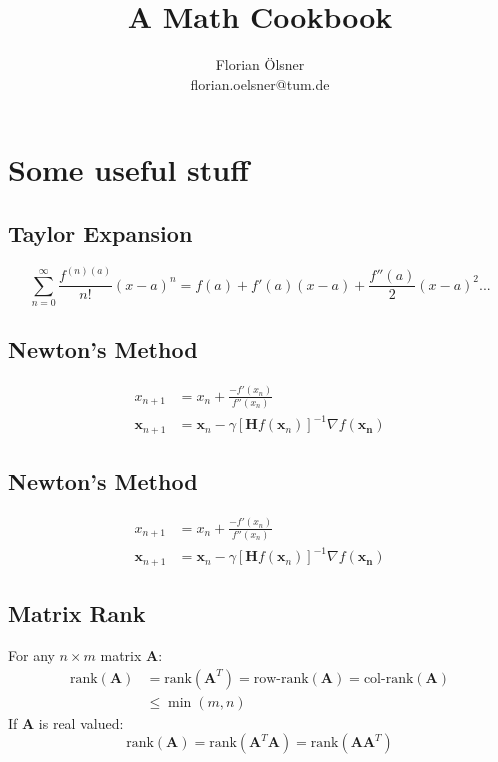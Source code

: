 \documentclass[%
	pdftex,
	12pt,								%
	parskip=half,				%
	headheight = 12pt,	%
	headsepline,				%
	footsepline,				%
	footheight = 16pt,	%
	DIV=calc,						%
	BCOR=8mm,						%
	headinclude=false,	%
	footinclude=false,	%
]{scrreprt}						%
\title{A Math Cookbook}
\author{Florian \"Olsner\\florian.oelsner@tum.de}
\begin{document}
\maketitle
\newpage

 \chapter{Some useful stuff}
 \section{Taylor Expansion}
 \begin{equation}
 	\sum_{n=0}^{\infty} \frac{f^{(n)(a)}}{n!}(x - a)^n = f(a) + f'(a) (x-a) + \frac{f''(a)}{2}(x-a)^2 ...
 \end{equation}

 \section{Newton's Method}
 \begin{align}
 		x_{n+1} &= x_n + \frac{-f'(x_n)}{f''(x_n)} \\
		\bm{x}_{n+1} &= \bm{x}_n - \gamma[\bm{H} f(\bm{x}_n)]^{-1} \nabla f(\bm{x_n})
 \end{align}

 \section{Newton's Method}
 \begin{align}
 		x_{n+1} &= x_n + \frac{-f'(x_n)}{f''(x_n)} \\
		\bm{x}_{n+1} &= \bm{x}_n - \gamma[\bm{H} f(\bm{x}_n)]^{-1} \nabla f(\bm{x_n})
 \end{align}

\section{Matrix Rank}
For any $n \times m$ matrix $\bm{A}$:
\begin{align}
	\text{rank}(\bm{A}) &= \text{rank}(\bm{A}^T) = \text{row-rank}(\bm{A}) = \text{col-rank}(\bm{A})\\
	& \leq \min(m, n)
\end{align}
If $\bm{A}$ is real valued:
\begin{equation}
	\text{rank}(\bm{A}) = \text{rank}(\bm{A}^T \bm{A}) = \text{rank}(\bm{A} \bm{A}^T)
\end{equation}
\end{document}
